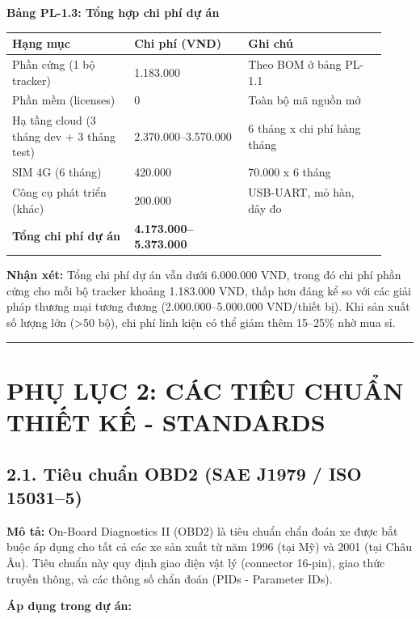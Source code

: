 \documentclass[13pt,a4paper]{extarticle}
\newcounter{none} %
\newcommand{\thesislongtableorignewline}{}
\let\thesislongtableorignewline\\
\renewcommand{\\}{\thesislongtableorignewline\hline}%
\let\\\thesislongtableorignewline
\newcommand{\appendixsection}[1]{\clearpage\section{#1}}
\newcommand{\thesistabletitle}[1]{%
  \begin{center}\textbf{#1}\end{center}%
}
\begin{document}
\thesistabletitle{Bảng PL-1.3: Tổng hợp chi phí dự án}

{\def\LTcaptype{none} %
\begin{longtable}{|p{0.30\linewidth}|p{0.28\linewidth}|p{0.34\linewidth}|}
\hline \textbf{Hạng mục} & \textbf{Chi phí (VND)} & \textbf{Ghi chú} \\
\hline
\endhead
\hline
\endlastfoot
Phần cứng (1 bộ tracker) & 1.183.000 & Theo BOM ở bảng PL-1.1 \\
Phần mềm (licenses) & 0 & Toàn bộ mã nguồn mở \\
Hạ tầng cloud (3 tháng dev + 3 tháng test) & 2.370.000--3.570.000 & 6
tháng x chi phí hàng tháng \\
SIM 4G (6 tháng) & 420.000 & 70.000 x 6 tháng \\
Công cụ phát triển (khác) & 200.000 & USB-UART, mỏ hàn, dây đo \\
\textbf{Tổng chi phí dự án} & \textbf{4.173.000--5.373.000} & \\
\end{longtable}
}

\textbf{Nhận xét:} Tổng chi phí dự án vẫn dưới 6.000.000 VND, trong đó
chi phí phần cứng cho mỗi bộ tracker khoảng 1.183.000 VND, thấp hơn đáng
kể so với các giải pháp thương mại tương đương (2.000.000--5.000.000
VND/thiết bị). Khi sản xuất số lượng lớn (\textgreater50 bộ), chi phí
linh kiện có thể giảm thêm 15--25\% nhờ mua sỉ.

\begin{center}\rule{0.5\linewidth}{0.5pt}\end{center}

\appendixsection{PHỤ LỤC 2: CÁC TIÊU CHUẨN THIẾT KẾ -
STANDARDS}\label{phux1ee5-lux1ee5c-2-cuxe1c-tiuxeau-chuux1ea9n-thiux1ebft-kux1ebf---standards}

\subsection{2.1. Tiêu chuẩn OBD2 (SAE J1979 / ISO
15031--5)}\label{21-tiuxeau-chuux1ea9n-obd2-sae-j1979--iso-150315}

\textbf{Mô tả:} On-Board Diagnostics II (OBD2) là tiêu chuẩn chẩn đoán
xe được bắt buộc áp dụng cho tất cả các xe sản xuất từ năm 1996 (tại Mỹ)
và 2001 (tại Châu Âu). Tiêu chuẩn này quy định giao diện vật lý
(connector 16-pin), giao thức truyền thông, và các thông số chẩn đoán
(PIDs - Parameter IDs).

\textbf{Áp dụng trong dự án:}
\end{document}
